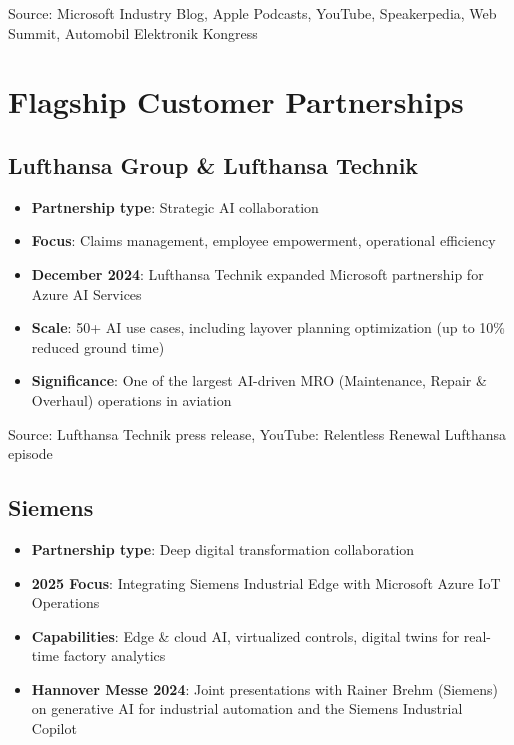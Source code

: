 \documentclass[11pt,a4paper]{article}
\begin{document}
\textcolor{msgray}{\scriptsize Source: Microsoft Industry Blog, Apple Podcasts, YouTube, Speakerpedia, Web Summit, Automobil Elektronik Kongress}

\newpage

\section{Flagship Customer Partnerships}

\subsection{Lufthansa Group \& Lufthansa Technik}

\begin{itemize}
    \item \textbf{Partnership type}: Strategic AI collaboration
    \item \textbf{Focus}: Claims management, employee empowerment, operational efficiency
    \item \textbf{December 2024}: Lufthansa Technik expanded Microsoft partnership for Azure AI Services
    \item \textbf{Scale}: 50+ AI use cases, including layover planning optimization (up to 10\% reduced ground time)
    \item \textbf{Significance}: One of the largest AI-driven MRO (Maintenance, Repair \& Overhaul) operations in aviation
\end{itemize}

\textcolor{msgray}{\scriptsize Source: Lufthansa Technik press release, YouTube: Relentless Renewal Lufthansa episode}

\subsection{Siemens}

\begin{itemize}
    \item \textbf{Partnership type}: Deep digital transformation collaboration
    \item \textbf{2025 Focus}: Integrating Siemens Industrial Edge with Microsoft Azure IoT Operations
    \item \textbf{Capabilities}: Edge \& cloud AI, virtualized controls, digital twins for real-time factory analytics
    \item \textbf{Hannover Messe 2024}: Joint presentations with Rainer Brehm (Siemens) on generative AI for industrial automation and the Siemens Industrial Copilot
\end{itemize}
\end{document}
